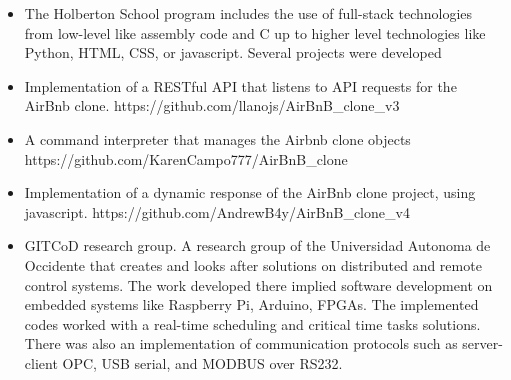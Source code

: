 \documentclass[paper=a4,fontsize=10pt,ragged2e,withhyper]{altacv}%
\begin{document}
%
\normalsize%

\sloppy%

\makecvheader%
%
\begin{paracol}{2}%
\begin{itemize}
 \item The Holberton School program includes the use of full{-}stack technologies from low{-}level like assembly code and C up to higher level technologies like Python, HTML, CSS, or javascript. Several projects were developed 
\end{itemize}
\divider
{}
\begin{itemize}
 \item Implementation of a RESTful API that listens to API requests for the AirBnb clone.\newline%
https://github.com/llanojs/AirBnB\_clone\_v3 
\end{itemize}
\divider
{}
\begin{itemize}
 \item A command interpreter that manages the Airbnb clone objects\newline%
https://github.com/KarenCampo777/AirBnB\_clone 
\end{itemize}
\divider
{}
\begin{itemize}
 \item Implementation of a dynamic response of the AirBnb clone project, using javascript.\newline%
https://github.com/AndrewB4y/AirBnB\_clone\_v4 
\end{itemize}
\divider
{}
\begin{itemize}
 \item GITCoD research group. A research group of the Universidad Autonoma de Occidente that creates and looks after solutions on distributed and remote control systems. \newline%
The work developed there implied software development on embedded systems like Raspberry Pi, Arduino, FPGAs. The implemented codes worked with a real{-}time scheduling and critical time tasks solutions. There was also an implementation of communication protocols such as server{-}client OPC, USB serial, and MODBUS over RS232.\newline%

\end{itemize}
\end{paracol}
\end{document}
